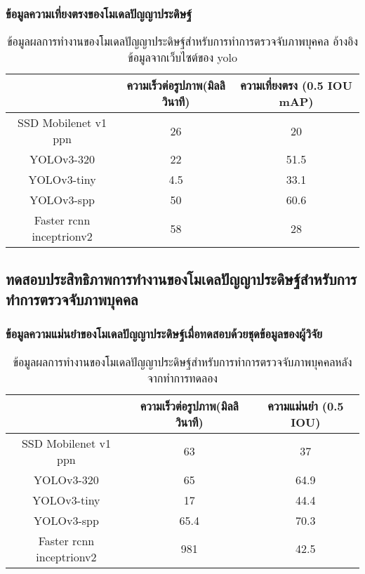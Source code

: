 \subsubsection*{ข้อมูลความเที่ยงตรงของโมเดลปัญญาประดิษฐ์}
\begin{table}[!ht]
    \centering
	\begin{tabular}{|c|c|c|}
			\hline
			{}&{ความเร็วต่อรูปภาพ(มิลลิวินาที)}&{ความเที่ยงตรง (0.5 IOU mAP)}			\\
			\hline
			SSD Mobilenet v1 ppn	 		& 26				& 20														\\
			YOLOv3-320				& 22				& 51.5				\\	
			YOLOv3-tiny				& 4.5				& 33.1				\\
			YOLOv3-spp				& 50				& 60.6				\\	
			Faster rcnn inceptrionv2		& 58				& 28		\\
		\hline
	\end{tabular}
	\caption{ข้อมูลผลการทำงานของโมเดลปัญญาประดิษฐ์สำหรับการทำการตรวจจับภาพบุคคล อ้างอิงข้อมูลจากเว็บไซต์ของ yolo}
    	\label{tab:origina_detectEx}
\end{table}


\subsection{ทดสอบประสิทธิภาพการทำงานของโมเดลปัญญาประดิษฐ์สำหรับการทำการตรวจจับภาพบุคคล}
\subsubsection*{ข้อมูลความแม่นยำของโมเดลปัญญาประดิษฐ์เมื่อทดสอบด้วยชุดข้อมูลของผู้วิจัย}
\begin{table}[!ht]
	\centering
	\begin{tabular}{|c|c|c|}
			\hline 
			{}&{ความเร็วต่อรูปภาพ(มิลลิวินาที)}&{ความแม่นยำ (0.5 IOU)}			\\
			\hline
			SSD Mobilenet v1 ppn	 					& 63 			& 37			\\
			YOLOv3-320							& 65			& 64.9		\\
			YOLOv3-tiny							& 17			& 44.4			\\
			YOLOv3-spp							& 65.4			& 70.3			\\	
			Faster rcnn inceptrionv2					& 981		& 42.5		\\
		\hline
	\end{tabular}
	\caption{ข้อมูลผลการทำงานของโมเดลปัญญาประดิษฐ์สำหรับการทำการตรวจจับภาพบุคคลหลังจากทำการทดลอง}
    \label{tab:origina_detectEx}
\end{table}
